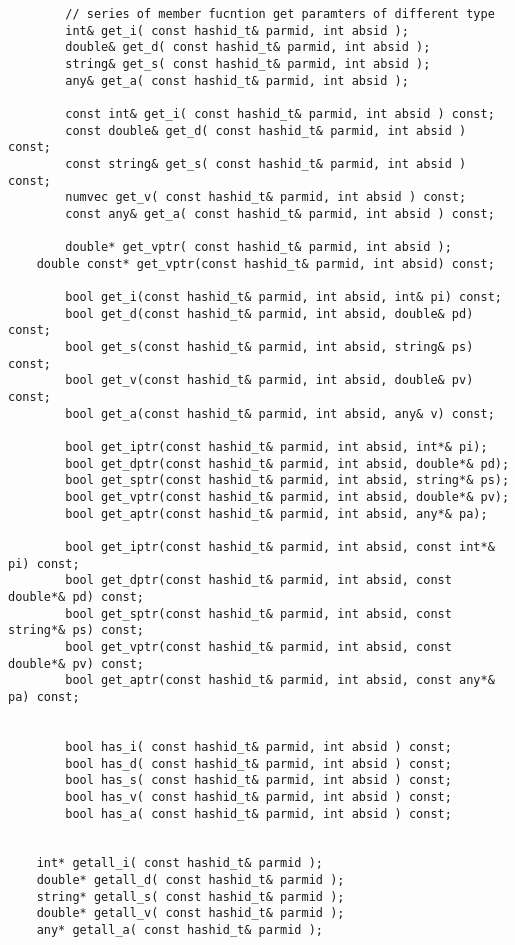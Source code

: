 \documentclass[letterpaper]{book}
\begin{document}
\begin{lstlisting}
        // series of member fucntion get paramters of different type
        int& get_i( const hashid_t& parmid, int absid ); 
        double& get_d( const hashid_t& parmid, int absid );
        string& get_s( const hashid_t& parmid, int absid ); 
        any& get_a( const hashid_t& parmid, int absid ); 

        const int& get_i( const hashid_t& parmid, int absid ) const; 
        const double& get_d( const hashid_t& parmid, int absid ) const;
        const string& get_s( const hashid_t& parmid, int absid ) const;
        numvec get_v( const hashid_t& parmid, int absid ) const; 
        const any& get_a( const hashid_t& parmid, int absid ) const; 

        double* get_vptr( const hashid_t& parmid, int absid ); 
	double const* get_vptr(const hashid_t& parmid, int absid) const; 

        bool get_i(const hashid_t& parmid, int absid, int& pi) const; 
        bool get_d(const hashid_t& parmid, int absid, double& pd) const; 
        bool get_s(const hashid_t& parmid, int absid, string& ps) const; 
        bool get_v(const hashid_t& parmid, int absid, double& pv) const; 
        bool get_a(const hashid_t& parmid, int absid, any& v) const; 

        bool get_iptr(const hashid_t& parmid, int absid, int*& pi); 
        bool get_dptr(const hashid_t& parmid, int absid, double*& pd);
        bool get_sptr(const hashid_t& parmid, int absid, string*& ps);
        bool get_vptr(const hashid_t& parmid, int absid, double*& pv); 
        bool get_aptr(const hashid_t& parmid, int absid, any*& pa); 

        bool get_iptr(const hashid_t& parmid, int absid, const int*& pi) const;
        bool get_dptr(const hashid_t& parmid, int absid, const double*& pd) const;
        bool get_sptr(const hashid_t& parmid, int absid, const string*& ps) const;
        bool get_vptr(const hashid_t& parmid, int absid, const double*& pv) const;
        bool get_aptr(const hashid_t& parmid, int absid, const any*& pa) const; 

       
        bool has_i( const hashid_t& parmid, int absid ) const;  
        bool has_d( const hashid_t& parmid, int absid ) const;  
        bool has_s( const hashid_t& parmid, int absid ) const;  
        bool has_v( const hashid_t& parmid, int absid ) const;  
        bool has_a( const hashid_t& parmid, int absid ) const;  

        
	int* getall_i( const hashid_t& parmid );
	double* getall_d( const hashid_t& parmid );
	string* getall_s( const hashid_t& parmid );
	double* getall_v( const hashid_t& parmid );
	any* getall_a( const hashid_t& parmid );


\end{lstlisting}
\end{document}
